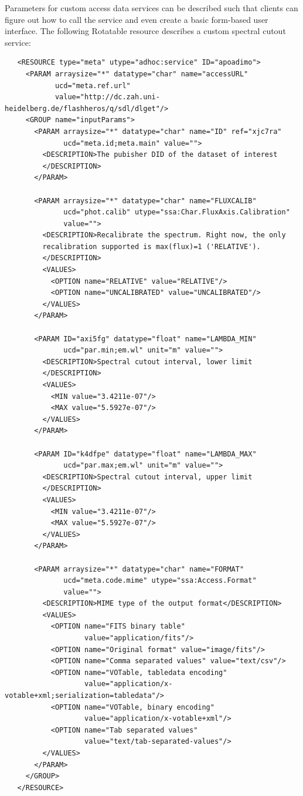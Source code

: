 \documentclass[11pt,a4paper]{ivoa}
\begin{document}
Parameters for custom access data services can be described such that
clients can figure out how to call the service and even create a basic
form-based user interface. The following Rotatable resource describes
a custom spectral cutout service:
{\small
\begin{verbatim}
   <RESOURCE type="meta" utype="adhoc:service" ID="apoadimo">
     <PARAM arraysize="*" datatype="char" name="accessURL"
            ucd="meta.ref.url"
            value="http://dc.zah.uni-heidelberg.de/flashheros/q/sdl/dlget"/>
     <GROUP name="inputParams">
       <PARAM arraysize="*" datatype="char" name="ID" ref="xjc7ra"
              ucd="meta.id;meta.main" value="">
         <DESCRIPTION>The pubisher DID of the dataset of interest
         </DESCRIPTION>
       </PARAM>

       <PARAM arraysize="*" datatype="char" name="FLUXCALIB"
              ucd="phot.calib" utype="ssa:Char.FluxAxis.Calibration"
              value="">
         <DESCRIPTION>Recalibrate the spectrum. Right now, the only
         recalibration supported is max(flux)=1 ('RELATIVE').
         </DESCRIPTION>
         <VALUES>
           <OPTION name="RELATIVE" value="RELATIVE"/>
           <OPTION name="UNCALIBRATED" value="UNCALIBRATED"/>
         </VALUES>
       </PARAM>

       <PARAM ID="axi5fg" datatype="float" name="LAMBDA_MIN"
              ucd="par.min;em.wl" unit="m" value="">
         <DESCRIPTION>Spectral cutout interval, lower limit
         </DESCRIPTION>
         <VALUES>
           <MIN value="3.4211e-07"/>
           <MAX value="5.5927e-07"/>
         </VALUES>
       </PARAM>

       <PARAM ID="k4dfpe" datatype="float" name="LAMBDA_MAX"
              ucd="par.max;em.wl" unit="m" value="">
         <DESCRIPTION>Spectral cutout interval, upper limit
         </DESCRIPTION>
         <VALUES>
           <MIN value="3.4211e-07"/>
           <MAX value="5.5927e-07"/>
         </VALUES>
       </PARAM>

       <PARAM arraysize="*" datatype="char" name="FORMAT"
              ucd="meta.code.mime" utype="ssa:Access.Format"
              value="">
         <DESCRIPTION>MIME type of the output format</DESCRIPTION>
         <VALUES>
           <OPTION name="FITS binary table"
                   value="application/fits"/>
           <OPTION name="Original format" value="image/fits"/>
           <OPTION name="Comma separated values" value="text/csv"/>
           <OPTION name="VOTable, tabledata encoding"
                   value="application/x-votable+xml;serialization=tabledata"/>
           <OPTION name="VOTable, binary encoding"
                   value="application/x-votable+xml"/>
           <OPTION name="Tab separated values"
                   value="text/tab-separated-values"/>
         </VALUES>
       </PARAM>
     </GROUP>
   </RESOURCE>
\end{verbatim}
}
\end{document}
